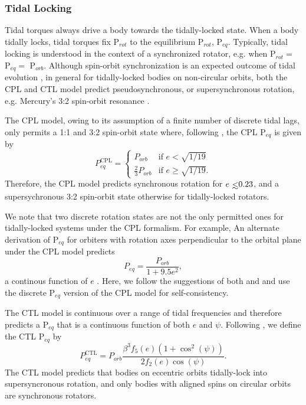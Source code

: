 \documentclass[twocolumn]{aastex61}
\def\lsim{~\rlap{$<$}{\lower 1.0ex\hbox{$\sim$}}}
\begin{document}
\subsubsection{Tidal Locking}

Tidal torques always drive a body towards the tidally-locked state. When a body tidally locks, tidal torques fix P$_{rot}$ to the equilibrium P$_{rot}$, P$_{eq}$.  Typically, tidal locking is understood in the context of a synchronized rotator, e.g. when P$_{rot} = $ P$_{eq} = $ P$_{orb}$. Although spin-orbit synchronization is an expected outcome of tidal evolution \citep{Counselman1973}, in general for tidally-locked bodies on non-circular orbits, both the CPL and CTL model predict pseudosynchronous, or supersynchronous rotation, e.g. Mercury's 3:2 spin-orbit resonance \citep[P$_{rot} = 2/3$ P$_{orb}$,][]{GoldreichPeale1966}.   

The CPL model, owing to its assumption of a finite number of discrete tidal lags, only permits a 1:1 and 3:2 spin-orbit state where, following \citet{Barnes2017}, the CPL P$_{eq}$ is given by
\begin{equation} \label{eqn:cpl:eqPer}
P^{\mathrm{CPL}}_{eq} = 
\begin{cases}
P_{orb} & \text{if } e < \sqrt{1/19}\\
\frac{2}{3}P_{orb} & \text{if } e \geq \sqrt{1/19}.
\end{cases}
\end{equation}
Therefore, the CPL model predicts synchronous rotation for $e \lsim 0.23$, and a supersychronous 3:2 spin-orbit state otherwise for tidally-locked rotators.

We note that two discrete rotation states are not the only permitted ones for tidally-locked systems under the CPL formalism. For example, An alternate derivation of P$_{eq}$ for orbiters with rotation axes perpendicular to the orbital plane under the CPL model predicts
\begin{equation} \label{eqn:cpl:eqPerCont}
P_{eq} = \frac{P_{orb}}{1 + 9.5e^2},
\end{equation}
a continous function of $e$ \citep{Goldreich1966b,Murray1999}. Here, we follow the suggestions of both \citet{Barnes2013} and \citet{Barnes2017} and use the discrete P$_{eq}$ version of the CPL model for self-consistency.

The CTL model is continuous over a range of tidal frequencies and therefore predicts a P$_{eq}$ that is a continuous function of both $e$ and $\psi$.  Following \citet{Barnes2017}, we define the CTL P$_{eq}$ by
\begin{equation} \label{eqn:ctl:eqPer}
P^{\mathrm{CTL}}_{eq} = P_{orb} \frac{\beta^3 f_5(e) (1 + \cos^2(\psi))}{2f_2(e) \cos(\psi)}.
\end{equation}
The CTL model predicts that bodies on eccentric orbits tidally-lock into supersyncronous rotation, and only bodies with aligned spins on circular orbits are synchronous rotators. 
\end{document}
